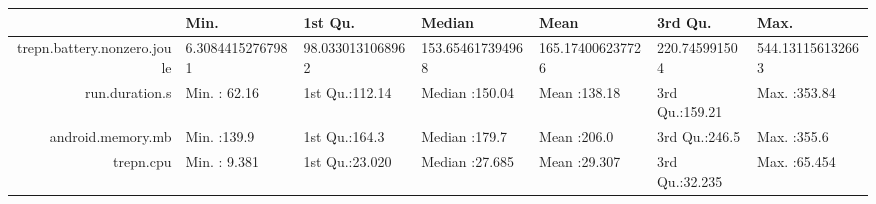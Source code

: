 \begin{table}[ht]
\centering
\begin{tabular}{rllllll}
  \hline
 & Min. & 1st Qu. & Median & Mean & 3rd Qu. & Max. \\ 
  \hline
trepn.battery.nonzero.joule & 6.30844152767981 & 98.0330131068962 & 153.654617394968 & 165.174006237726 & 220.745991504 & 544.131156132663 \\ 
  run.duration.s & Min.   : 62.16   & 1st Qu.:112.14   & Median :150.04   & Mean   :138.18   & 3rd Qu.:159.21   & Max.   :353.84   \\ 
  android.memory.mb & Min.   :139.9   & 1st Qu.:164.3   & Median :179.7   & Mean   :206.0   & 3rd Qu.:246.5   & Max.   :355.6   \\ 
    trepn.cpu & Min.   : 9.381   & 1st Qu.:23.020   & Median :27.685   & Mean   :29.307   & 3rd Qu.:32.235   & Max.   :65.454   \\ 
   \hline
\end{tabular}
\end{table}
